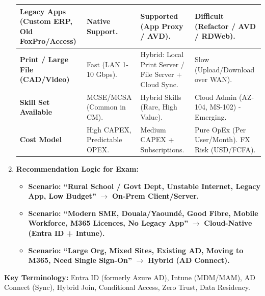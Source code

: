 \documentclass[11pt]{article}
\begin{document}
\begin{methode}
\begin{enumerate}
\begin{center}
\begin{tabularx}{\linewidth}{|l|X|X|X|}
    \hline
    \textbf{Legacy Apps (Custom ERP, Old FoxPro/Access)} & Native Support. & Supported (App Proxy / AVD). & Difficult (Refactor / AVD / RDWeb). \\
    \hline
    \textbf{Print / Large File (CAD/Video)} & Fast (LAN 1-10 Gbps). & Hybrid: Local Print Server / File Server + Cloud Sync. & Slow (Upload/Download over WAN). \\
    \hline
    \textbf{Skill Set Available} & MCSE/MCSA (Common in CM). & Hybrid Skills (Rare, High Value). & Cloud Admin (AZ-104, MS-102) - Emerging. \\
    \hline
    \textbf{Cost Model} & High CAPEX, Predictable OPEX. & Medium CAPEX + Subscriptions. & Pure OpEx (Per User/Month). FX Risk (USD/FCFA). \\
    \hline
    \end{tabularx}
    \end{center}
    \item \textbf{Recommendation Logic for Exam:}
    \begin{itemize}
        \item \textbf{Scenario: ``Rural School / Govt Dept, Unstable Internet, Legacy App, Low Budget''} $\rightarrow$ \textbf{On-Prem Client/Server.}
        \item \textbf{Scenario: ``Modern SME, Douala/Yaoundé, Good Fibre, Mobile Workforce, M365 Licences, No Legacy App''} $\rightarrow$ \textbf{Cloud-Native (Entra ID + Intune).}
        \item \textbf{Scenario: ``Large Org, Mixed Sites, Existing AD, Moving to M365, Need Single Sign-On''} $\rightarrow$ \textbf{Hybrid (AD Connect).}
    \end{itemize}
\end{enumerate}
\textbf{Key Terminology:} Entra ID (formerly Azure AD), Intune (MDM/MAM), AD Connect (Sync), Hybrid Join, Conditional Access, Zero Trust, Data Residency.
\end{methode}
\end{document}
